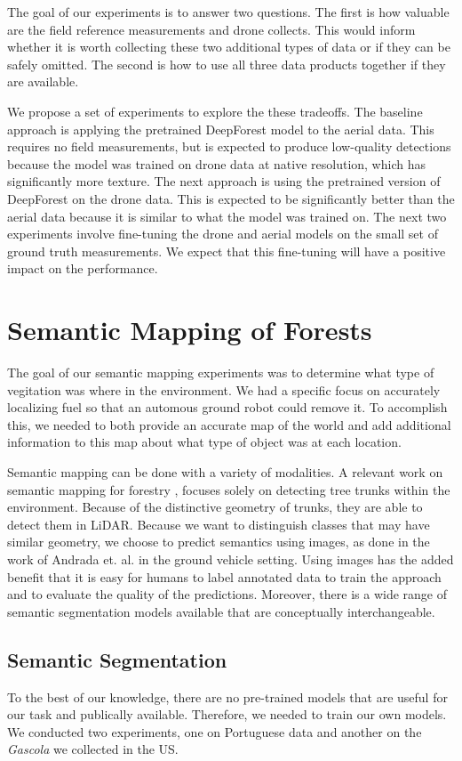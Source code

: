 The goal of our experiments is to answer two questions. The first is how valuable are the field reference measurements and drone collects. This would inform whether it is worth collecting these two additional types of data or if they can be safely omitted. The second is how to use all three data products together if they are available.

We propose a set of experiments to explore the these tradeoffs. The baseline approach is applying the pretrained DeepForest model to the aerial data. This requires no field measurements, but is expected to produce low-quality detections because the model was trained on drone data at native resolution, which has significantly more texture. The next approach is using the pretrained version of DeepForest on the drone data. This is expected to be significantly better than the aerial data because it is similar to what the model was trained on. The next two experiments involve fine-tuning the drone and aerial models on the small set of ground truth measurements. We expect that this fine-tuning will have a positive impact on the performance.

\section{Semantic Mapping of Forests}
The goal of our semantic mapping experiments was to determine what type of vegitation was where in the environment. We had a specific focus on accurately localizing fuel so that an automous ground robot could remove it. To accomplish this, we needed to both provide an accurate map of the world and add additional information to this map about what type of object was at each location.

Semantic mapping can be done with a variety of modalities. A relevant work on semantic mapping for forestry \cite{Chen2020SLOAM:Inventory}, focuses solely on detecting tree trunks within the environment. Because of the distinctive geometry of trunks, they are able to detect them in LiDAR. Because we want to distinguish classes that may have similar geometry, we choose to predict semantics using images, as done in the work of Andrada et. al. \cite{Andrada2020} in the ground vehicle setting. Using images has the added benefit that it is easy for humans to label annotated data to train the approach and to evaluate the quality of the predictions. Moreover, there is a wide range of semantic segmentation models available that are conceptually interchangeable. 

\subsection{Semantic Segmentation}
To the best of our knowledge, there are no pre-trained models that are useful for our task and publically available. Therefore, we needed to train our own models. We conducted two experiments, one on Portuguese data and another on the \textit{Gascola} we collected in the US. 

